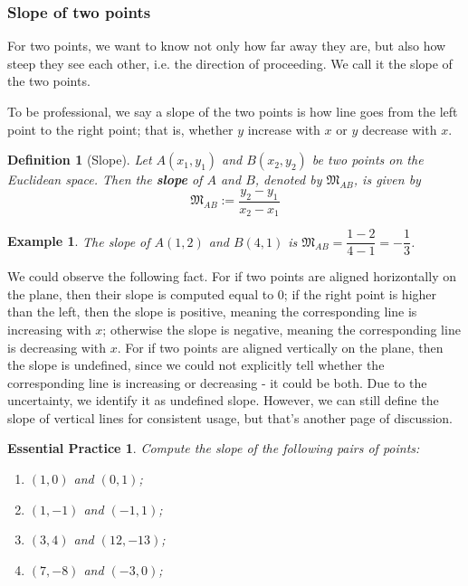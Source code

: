 \documentclass[12pt]{article}
\newtheorem{definition}{Definition}[section]
\newtheorem*{example}{Example}
\newtheorem{exercise}{Essential Practice}[subsubsection]
\begin{document}
    \subsubsection{Slope of two points}

    For two points, we want to know not only how far away they are, but also how steep they see each other, i.e. the direction of proceeding. We call it the slope of the two points.

    To be professional, we say a slope of the two points is how line goes from the left point to the right point; that is, whether $y$ increase with $x$ or $y$ decrease with $x$.

    \begin{definition}[Slope]
        Let $A(x_1,y_1)$ and $B(x_2,y_2)$ be two points on the Euclidean space. Then the \textbf{slope} of $A$ and $B$, denoted by $\mathfrak{M}_{AB}$, is given by $$\mathfrak{M}_{AB}:=\frac{y_2-y_1}{x_2-x_1}$$
    \end{definition}

    \begin{example}
        The slope of $A(1,2)$ and $B(4,1)$ is $\mathfrak{M}_{AB}=\dfrac{1-2}{4-1}=-\dfrac{1}{3}$.
    \end{example}

    We could observe the following fact. For if two points are aligned horizontally on the plane, then their slope is computed equal to 0; if the right point is higher than the left, then the slope is positive, meaning the corresponding line is increasing with $x$; otherwise the slope is negative, meaning the corresponding line is decreasing with $x$. For if two points are aligned vertically on the plane, then the slope is undefined, since we could not explicitly tell whether the corresponding line is increasing or decreasing - it could be both. Due to the uncertainty, we identify it as undefined slope. However, we can still define the slope of vertical lines for consistent usage, but that's another page of discussion.

    \begin{exercise}
        Compute the slope of the following pairs of points:\begin{enumerate}
            \item $(1,0)$ and $(0,1)$;
            \item $(1,-1)$ and $(-1,1)$;
            \item $(3,4)$ and $(12,-13)$;
            \item $(7,-8)$ and $(-3,0)$;
        \end{enumerate}
    \end{exercise}
\end{document}

